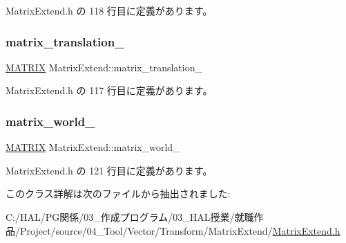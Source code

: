  Matrix\+Extend.\+h の 118 行目に定義があります。

\mbox{\label{class_matrix_extend_a265c3939a53787d87ee9c27386ebff7f}} 
\subsubsection{\texorpdfstring{matrix\+\_\+translation\+\_\+}{matrix\_translation\_}}
{\footnotesize\ttfamily \mbox{\hyperlink{_vector3_d_8h_a032295cd9fb1b711757c90667278e744}{M\+A\+T\+R\+IX}} Matrix\+Extend\+::matrix\+\_\+translation\+\_\+\hspace{0.3cm}{\ttfamily [private]}}



 Matrix\+Extend.\+h の 117 行目に定義があります。

\mbox{\label{class_matrix_extend_ae464d60827194857bc39c2f0cffd768b}} 
\subsubsection{\texorpdfstring{matrix\+\_\+world\+\_\+}{matrix\_world\_}}
{\footnotesize\ttfamily \mbox{\hyperlink{_vector3_d_8h_a032295cd9fb1b711757c90667278e744}{M\+A\+T\+R\+IX}} Matrix\+Extend\+::matrix\+\_\+world\+\_\+\hspace{0.3cm}{\ttfamily [private]}}



 Matrix\+Extend.\+h の 121 行目に定義があります。



このクラス詳解は次のファイルから抽出されました\+:\begin{DoxyCompactItemize}
\item 
C\+:/\+H\+A\+L/\+P\+G関係/03\+\_\+作成プログラム/03\+\_\+\+H\+A\+L授業/就職作品/\+Project/source/04\+\_\+\+Tool/\+Vector/\+Transform/\+Matrix\+Extend/\mbox{\hyperlink{_matrix_extend_8h}{Matrix\+Extend.\+h}}\end{DoxyCompactItemize}
